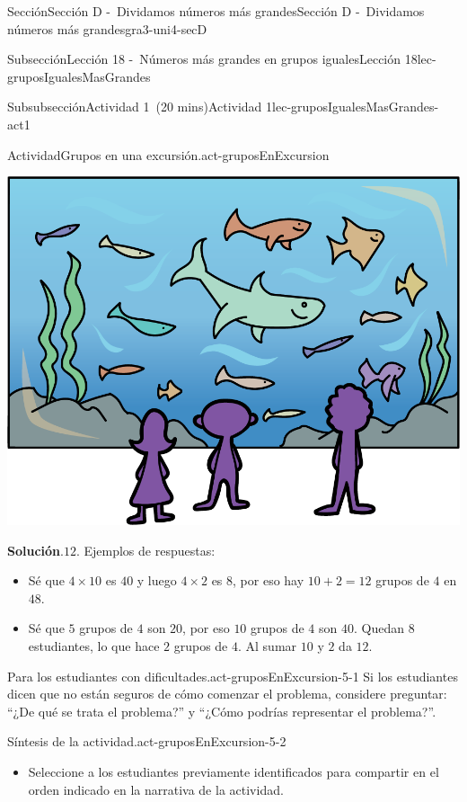 \documentclass[oneside,10pt,]{article}
\newcommand{\blocktitlefont}{\relax}
\begin{document}
\begin{sectionptx}{Sección}{Sección D -~Dividamos números más grandes}{}{Sección D -~Dividamos números más grandes}{}{}{gra3-uni4-secD}
\begin{subsectionptx}{Subsección}{Lección 18 -~Números más grandes en grupos iguales}{}{Lección 18}{}{}{lec-gruposIgualesMasGrandes}
\begin{subsubsectionptx}{Subsubsección}{Actividad 1~(20 mins)}{}{Actividad 1}{}{}{lec-gruposIgualesMasGrandes-act1}
\begin{activity}{Actividad}{Grupos en una excursión.}{act-gruposEnExcursion}
\begin{image}{0.15}{0.7}{0.15}{}
\includegraphics[width=\linewidth]{external/png-source/CS 3.4 Lesson 18 Activity 1.png}
\end{image}%
\par\smallskip%
\noindent\textbf{\blocktitlefont Solución}.\hypertarget{act-gruposEnExcursion-3}{}\quad{}\(12\). Ejemplos de respuestas:%
%
\begin{itemize}[label=\textbullet]
\item{}Sé que \(4\times 10\) es \(40\) y luego \(4\times 2\) es \(8\), por eso hay \(10 + 2 = 12\) grupos de \(4\) en \(48\).%
\item{}Sé que \(5\) grupos de \(4\) son \(20\), por eso \(10\) grupos de \(4\) son \(40\). Quedan \(8\) estudiantes, lo que hace \(2\) grupos de \(4\). Al sumar \(10\) y \(2\) da \(12\).%
\end{itemize}
\end{activity}%
\par
\begin{paragraphs}{Para los estudiantes con dificultades.}{act-gruposEnExcursion-5-1}%
Si los estudiantes dicen que no están seguros de cómo comenzar el problema, considere preguntar: ``¿De qué se trata el problema?'' y ``¿Cómo podrías representar el problema?''.%
\end{paragraphs}%
\begin{paragraphs}{Síntesis de la actividad.}{act-gruposEnExcursion-5-2}%
%
\begin{itemize}[label=\textbullet]
\item{}Seleccione a los estudiantes previamente identificados para compartir en el orden indicado en la narrativa de la actividad.%

\end{itemize}
\end{paragraphs}
\end{subsubsectionptx}
\end{subsectionptx}
\end{sectionptx}
\end{document}
